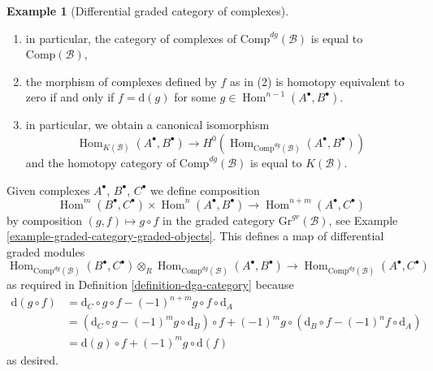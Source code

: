\documentclass{stacks-project}
\theoremstyle{plain}
\theoremstyle{definition}
\newtheorem{example}[subsection]{Example}
\theoremstyle{remark}
\numberwithin{equation}{subsection}
\def\Hom{\mathop{\mathrm{Hom}}\nolimits}
\begin{document}
\begin{example}[Differential graded category of complexes]
\begin{enumerate}
is actually a map of complexes,
\item in particular, the category of complexes of
$\text{Comp}^{dg}(\mathcal{B})$ is equal to $\text{Comp}(\mathcal{B})$,
\item the morphism of complexes defined by $f$ as in (2)
is homotopy equivalent to zero if and only if $f = \text{d}(g)$
for some $g \in \Hom^{n - 1}(A^\bullet, B^\bullet)$.
\item in particular, we obtain a canonical isomorphism
$$
\Hom_{K(\mathcal{B})}(A^\bullet, B^\bullet)
\longrightarrow
H^0(\Hom_{\text{Comp}^{dg}(\mathcal{B})}(A^\bullet, B^\bullet))
$$
and the homotopy category of $\text{Comp}^{dg}(\mathcal{B})$ is equal to
$K(\mathcal{B})$.
\end{enumerate}
Given complexes $A^\bullet$, $B^\bullet$, $C^\bullet$ we define
composition
$$
\Hom^m(B^\bullet, C^\bullet) \times \Hom^n(A^\bullet, B^\bullet)
\longrightarrow
\Hom^{n + m}(A^\bullet, C^\bullet)
$$
by composition $(g, f) \mapsto g \circ f$ in the graded category
$\text{Gr}^{gr}(\mathcal{B})$, see
Example \ref{example-graded-category-graded-objects}.
This defines a map of differential graded modules
$$
\Hom_{\text{Comp}^{dg}(\mathcal{B})}(B^\bullet, C^\bullet)
\otimes_R
\Hom_{\text{Comp}^{dg}(\mathcal{B})}(A^\bullet, B^\bullet)
\longrightarrow
\Hom_{\text{Comp}^{dg}(\mathcal{B})}(A^\bullet, C^\bullet)
$$
as required in Definition \ref{definition-dga-category}
because
\begin{align*}
\text{d}(g \circ f) & =
\text{d}_C \circ g \circ f - (-1)^{n + m} g \circ f \circ \text{d}_A \\
& =
\left(\text{d}_C \circ g - (-1)^m g \circ \text{d}_B\right) \circ f +
(-1)^m g \circ \left(\text{d}_B \circ f - (-1)^n f \circ \text{d}_A\right) \\
& =
\text{d}(g) \circ f + (-1)^m g \circ \text{d}(f)
\end{align*}
as desired.
\end{example}
\end{document}
